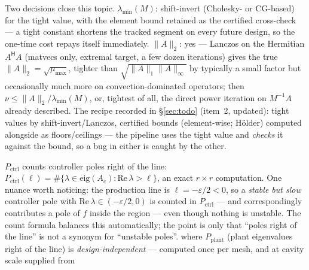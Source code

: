 \documentclass[11pt,a4paper]{article}
\newcommand{\eps}{\varepsilon}
\newcommand{\hp}{^{\mathsf H}}
\begin{document}
{Two decisions close this topic.  \emph{$\lambda_{\min}(M)$}: shift-invert
(Cholesky- or CG-based) for the tight value, with the element bound retained as the
certified cross-check --- a tight constant shortens the tracked segment on every future
design, so the one-time cost repays itself immediately.  \emph{$\|A\|_2$}: yes ---
Lanczos on the Hermitian $A\hp A$ (matvecs only, extremal target, a few dozen iterations)
gives the true $\|A\|_2=\sqrt{\mu_{\max}}$, tighter than
$\sqrt{\|A\|_1\|A\|_\infty}$ by typically a small factor but occasionally much more on
convection-dominated operators; then $\nu\le\|A\|_2/\lambda_{\min}(M)$, or, tightest of
all, the direct power iteration on $M^{-1}A$ already described.  The recipe recorded in
\S\ref{sec:todo} (item~2, updated): tight values by shift-invert/Lanczos, certified
bounds (element-wise; H\"older) computed alongside as floors/ceilings --- the pipeline
uses the tight value and \emph{checks} it against the bound, so a bug in either is caught
by the other.

$P_{\mathrm{ctrl}}$ counts controller poles right of the line:
$P_{\mathrm{ctrl}}(\ell)=\#\{\lambda\in\mathrm{eig}(A_c):
\mathrm{Re}\,\lambda>\ell\}$, an exact $r\times r$ computation.  One nuance worth
noticing: the production line is $\ell=-\eps/2<0$, so a \emph{stable but slow} controller
pole with $\mathrm{Re}\,\lambda\in(-\eps/2,0)$ is counted in $P_{\mathrm{ctrl}}$ --- and
correspondingly contributes a pole of $f$ inside the region --- even though nothing is
unstable.  The count formula balances this automatically; the point is only that
``poles right of the line'' is not a synonym for ``unstable poles''.
where $P_{\mathrm{plant}}$ (plant eigenvalues right of the line) is
\emph{design-independent} --- computed once per mesh, and at cavity scale supplied from

}
\end{document}

